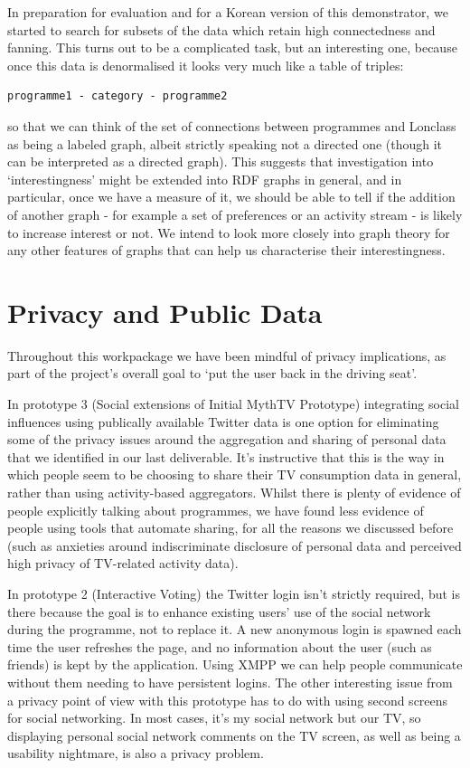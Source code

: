 \documentclass{notube}
\begin{document}
In preparation for evaluation and for a Korean version of this demonstrator, we started to search for subsets of the data which retain high connectedness and fanning. This turns out to be a complicated task, but an interesting one, because once this data is denormalised it looks very much like a table of triples:

\begin{verbatim}
programme1 - category - programme2
\end{verbatim}

so that we can think of the set of connections between programmes and Lonclass as being a labeled graph, albeit strictly speaking not a directed one (though it can be interpreted as a directed graph). This suggests that investigation into `interestingness' might be extended into RDF graphs in general, and in particular, once we have a measure of it, we should be able to tell if the addition of another graph - for example a set of preferences or an activity stream - is likely to increase interest or not. We intend to look more closely into graph theory for any other features of graphs that can help us characterise their interestingness.

\section{Privacy and Public Data}

Throughout this workpackage we have been mindful of privacy implications, as part of the project's overall goal to `put the user back in the driving seat'. 

In prototype 3 (Social extensions of Initial MythTV Prototype) integrating social influences using publically available Twitter data is one option for eliminating some of the privacy issues around the aggregation and sharing of personal data that we identified in our last deliverable. It's instructive that this is the way in which people seem to be choosing to share their TV consumption data in general, rather than using activity-based aggregators. Whilst there is plenty of evidence of people explicitly talking about programmes, we have found less evidence of people using tools that automate sharing, for all the reasons we discussed before (such as anxieties around indiscriminate disclosure of personal data and perceived high privacy of TV-related activity data).

In prototype 2 (Interactive Voting) the Twitter login isn't strictly required, but is there because the goal is to enhance existing users' use of the social network during the programme, not to replace it. A new anonymous login is spawned each time the user refreshes the page, and no information about the user (such as friends) is kept by the application. Using XMPP we can help people communicate without them needing to have persistent logins. The other interesting issue from a privacy point of view with this prototype has to do with using second screens for social networking. In most cases, it's my social network but our TV, so displaying personal social network comments on the TV screen, as well as being a usability nightmare, is also a privacy problem.
\end{document}
